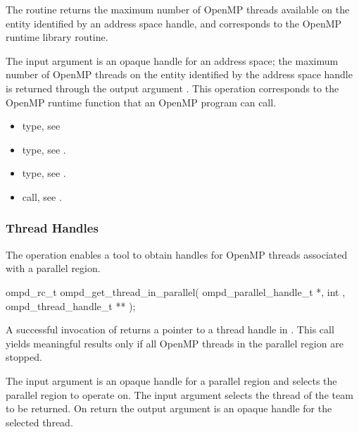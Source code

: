 \descr
The  routine returns the maximum
number of OpenMP threads available on the entity identified by
an address space handle, and corresponds to the  OpenMP
runtime library routine.

\argdesc
The input argument  is an opaque handle for an address space;
the maximum number of OpenMP threads on the entity identified by the
address space handle is returned through the output argument .
This operation corresponds to the OpenMP runtime function
 that an OpenMP program can call.

\crossreferences
\begin{itemize}
  \item {} type, see 
	\item {} type, see .
	\item {} type, see .
	\item {} call, see .
\end{itemize}


\subsubsection{Thread Handles}

\label{subsubsubsec:ompd_get_thread_in_parallel}
\summary
The   operation enables a tool to obtain handles for
OpenMP threads associated with a parallel region.

\format

\begin{cspecific}
\begin{ompSyntax}
ompd_rc_t ompd_get_thread_in_parallel(
  ompd_parallel_handle_t *,
  int ,
  ompd_thread_handle_t **
);
\end{ompSyntax}
\end{cspecific}


\descr
A successful invocation of   returns a pointer to
a thread handle in .
This call yields meaningful results only if all OpenMP threads in the parallel
region are stopped.

\argdesc
The input argument  is an opaque handle for a parallel region
 and selects the parallel region to operate on.
The input argument  selects the thread of the team to be returned.
On return the output argument  is an opaque handle for the selected thread.

